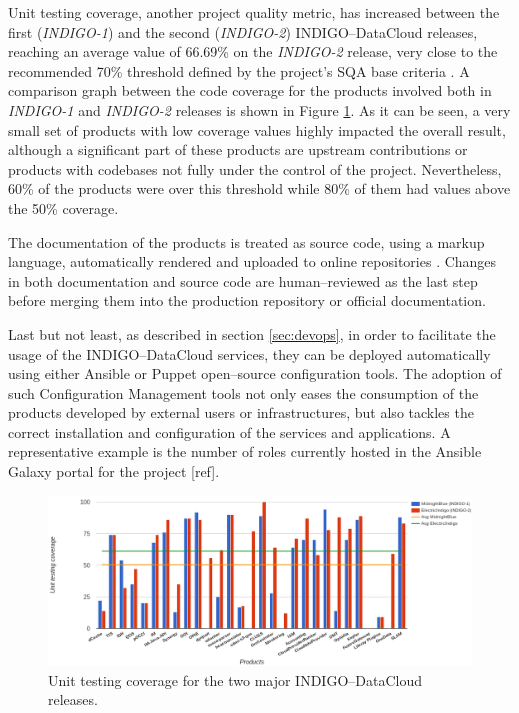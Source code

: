 \documentclass[journal]{IEEEtran}
\begin{document}
Unit testing coverage, another project quality metric, has increased between the first ({\sl INDIGO-1}) and the
second ({\sl INDIGO-2}) INDIGO--DataCloud releases, reaching an average value of
66.69\% on the {\sl INDIGO-2} release, very close to the recommended 70\% threshold
defined by the project’s SQA base criteria \cite{indigo-d31}. A comparison graph
between the code coverage for the products involved both in {\sl INDIGO-1} and
{\sl INDIGO-2} releases is shown in Figure \ref{fig:fig_unittest}. As it can be seen,
a very small set of products with low coverage values highly impacted the overall
result, although a significant part of these products are upstream contributions
or products with codebases not fully under the control of the project. Nevertheless,
60\% of the products were over this threshold while 80\% of them had values above
the 50\% coverage.

The documentation of the products is treated as source code, using a markup
language, automatically rendered and uploaded to online repositories
\cite{indigo-gitbook}. Changes in both documentation and source code are
human--reviewed as the last step before merging them into the production
repository or official documentation.

Last but not least, as described in section \ref{sec:devops}, in order
to facilitate the usage of the INDIGO--DataCloud services, they can be deployed
automatically using either Ansible \cite{indigo-ansible} or Puppet
\cite{indigo-puppet} open--source configuration tools. The adoption of such Configuration Management
tools not only eases the consumption of the products developed by external users or
infrastructures, but also tackles the correct installation and configuration of the
services and applications. A representative example is the number of roles currently
hosted in the Ansible Galaxy portal for the project [ref].

\begin{figure}[ht]
\centering
\includegraphics[width=\textwidth]{images/unittest.png}
\caption{Unit testing coverage for the two major INDIGO--DataCloud releases.}
\label{fig:fig_unittest}
\end{figure}
\end{document}
